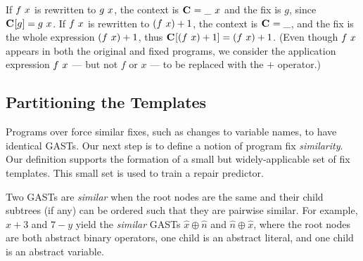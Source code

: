  If $f\ x$ is rewritten to $g\ x$, the context is
$\mathbf{C}_{} = \_\ x$ and the fix is $g$, since $\mathbf{C}_{}[g] =
g\ x$. If $f\ x$ is rewritten to $(f\ x) + 1$, the
context is $\mathbf{C}_{} = \_$, and the fix is the whole expression
$(f\ x) + 1$, thus $\mathbf{C}_{}[(f\ x) + 1] =
(f\ x) + 1$. (Even though $f\ x$ appears in both the
original and fixed programs, we consider the application expression
$f\ x$ --- but not $f$ or $x$ --- to be replaced with the $+$ operator.)

\subsection{Partitioning the Templates}

Programs over \lang force similar fixes, such as changes to variable names, to
have identical GASTs. Our next step is to define a notion of program fix
\emph{similarity}. Our definition supports the formation of a small but
widely-applicable set of fix templates. This small set is used to train a repair
predictor.

\label{subsec:partitioning}



Two GASTs are \emph{similar} when the root nodes are the same and their child
subtrees (if any) can be ordered such that they are pairwise similar. For
example, $x + 3$ and $7 - y$ yield the \emph{similar} GASTs $\hat{x} \oplus
\hat{n}$ and $\hat{n} \oplus \hat{x}$, where the root nodes are both abstract
binary operators, one child is an abstract literal, and one child is an abstract
variable.

